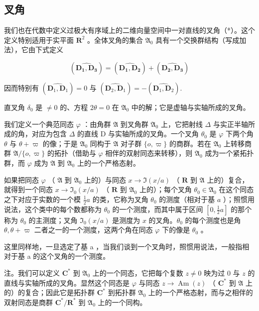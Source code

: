 \subsection{叉角}

我们也在代数中定义过极大有序域上的二维向量空间中一对直线的叉角（*）。这个定义特别适用于实平面 \(\mathbf{R}^2\) 。全体叉角的集合 \(\mathfrak{A}_0\) 具有一个交换群结构（写成加法），它由下式定义

\[
(\widehat {\mathbf {D _ {1} , D _ {3}}}) = (\widehat {\mathbf {D _ {1} , D _ {2}}}) + (\widehat {\mathbf {D _ {2} , D _ {3}}})
\]

因而特别有 \((\widehat{\mathbf{D}_1,\mathbf{D}_1}) = 0\) 与 \((\widehat{\mathbf{D}_2,\mathbf{D}_1}) = -(\widehat{\mathbf{D}_1,\mathbf{D}_2}).\)

直叉角 \(\delta_0\) 是 \(\neq 0\) 的、方程 \(2\theta = 0\) 在 \(\mathfrak{A}_0\) 中的解；它是虚轴与实轴所成的叉角。

我们定义一个典范同态 \(\varphi\) ：由角群 \(\mathfrak{A}\) 到叉角群 \(\mathfrak{A}_0\) 上，它把射线 \(\Delta\) 与实正半轴所成的角，对应为包含 \(\Delta\) 的直线 D 与实轴所成的叉角。一个叉角 \(\theta_0\) 是 \(\varphi\) 下两个角 \(\theta\) 与 \(\theta + \varpi\) 的像；于是 \(\mathfrak{A}_0\) 同构于 \(\mathfrak{A}\) 对子群 \(\{o, \varpi\}\) 的商群。若在 \(\mathfrak{A}_0\) 上转移商群 \(\mathfrak{A}/\{o, \varpi\}\) 的拓扑（借助与 \(\varphi\) 相伴的双射同态来转移），则 \(\mathfrak{A}_0\) 成为一个紧拓扑群，而 \(\varphi\) 成为 \(\mathfrak{A}\) 到 \(\mathfrak{A}_0\) 上的一个严格态射。

如果把同态 \(\varphi\) （ \(\mathfrak{A}\) 到 \(\mathfrak{A}_0\) 上的）与同态 \(x \to \Im(x/a)\) （ \(\mathbf{R}\) 到 \(\mathfrak{A}\) 上的）复合，就得到一个同态 \(x \to \Im_0(x/a)\) （ \(\mathbf{R}\) 到 \(\mathfrak{A}_0\) 上的）；每个叉角 \(\theta_0 \in \mathfrak{A}_0\) 在这个同态之下对应于实数的一个模 \(\frac{1}{2}a\) 的类，它称为叉角 \(\theta_0\) 的测度（相对于基 \(a\) ）；照惯用说法，这个类中的每个数都称为 \(\theta_0\) 的一个测度，而其中属于区间 \([0, \frac{1}{2}a]\) 的那个称为 \(\theta_0\) 的主测度；叉角 \(\Im_0(x/a)\) 是测度为 \(x\) 的叉角。\(\theta_0\) 的每个测度也是角 \(\theta, \theta + \varpi\) 二者之一的一个测度，这两个角在同态 \(\varphi\) 下的像是 \(\theta_0\) 。

这里同样地，一旦选定了基 a ，当我们谈到一个叉角时，照惯用说法，一般指相对于基 a 的这个叉角的一个测度。

注。我们可以定义 \(\mathbf{C}^*\) 到 \(\mathfrak{A}_0\) 上的一个同态，它把每个复数 \(z \neq 0\) 映为过 \(0\) 与 \(z\) 的直线与实轴所成的叉角。显然这个同态是 \(\varphi\) 与同态 \(z \to \operatorname{Am}(z)\) （ \(\mathbf{C}^*\) 到 \(\mathfrak{A}\) 上的）的复合；因此它是拓扑群 \(\mathbf{C}^*\) 到拓扑群 \(\mathfrak{A}_0\) 上的一个严格态射，而与之相伴的双射同态是商群 \(\mathbf{C}^*/\mathbf{R}^*\) 到 \(\mathfrak{A}_0\) 上的一个同构。


